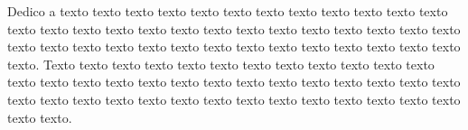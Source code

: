 \begin{dedicatoria}
   \vspace*{\fill}
   Dedico a texto texto texto texto texto texto texto texto texto texto texto texto texto texto texto texto texto texto texto texto texto texto texto texto texto texto texto texto texto texto texto texto texto texto texto texto texto texto texto texto texto. Texto texto texto texto texto texto texto texto texto texto texto texto texto texto texto texto texto texto texto texto texto texto texto texto texto texto texto texto texto texto texto texto texto texto texto texto texto texto texto texto texto texto.
\end{dedicatoria}
